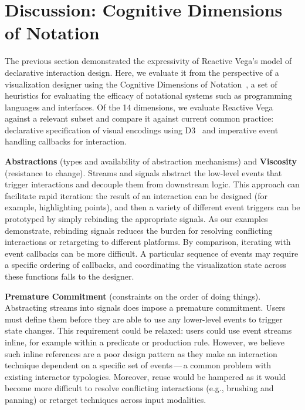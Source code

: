 
\vspace{-10pt}

\section{Discussion: Cognitive Dimensions of Notation}
\label{sec:vg:discussion}

\vspace{-10pt}

The previous section demonstrated the expressivity of Reactive Vega's model of
declarative interaction design. Here, we evaluate it from the perspective of a
visualization designer using the Cognitive Dimensions of
Notation~\cite{blackwell:cogdim}, a set of heuristics for evaluating the
efficacy of notational systems such as programming languages and interfaces. Of
the 14 dimensions, we evaluate Reactive Vega against a relevant subset and
compare it against current common practice: declarative specification of visual
encodings using D3~\cite{bostock:d3} and imperative event handling callbacks for
interaction.

\textbf{Abstractions} (types and availability of abstraction mechanisms) and
\textbf{Viscosity} (resistance to change). Streams and signals abstract the
low-level events that trigger interactions and decouple them from downstream
logic. This approach can facilitate rapid iteration: the result of an
interaction can be designed (for example, highlighting points), and then a
variety of different event triggers can be prototyped by simply rebinding the
appropriate signals. As our examples demonstrate, rebinding signals reduces the
burden for resolving conflicting interactions or retargeting to different
platforms. By comparison, iterating with event callbacks can be more difficult.
A particular sequence of events may require a specific ordering of callbacks,
and coordinating the visualization state across these functions falls to the
designer.

\textbf{Premature Commitment} (constraints on the order of doing things).
Abstracting streams into signals does impose a premature commitment. Users must
define them before they are able to use any lower-level events to trigger state
changes. This requirement could be relaxed: users could use event streams
inline, for example within a predicate or production rule. However, we believe
such inline references are a poor design pattern as they make an interaction
technique dependent on a specific set of events\,---\,a common problem with
existing interactor typologies. Moreover, reuse would be hampered as it would
become more difficult to resolve conflicting interactions (e.g., brushing and
panning) or retarget techniques across input modalities.

